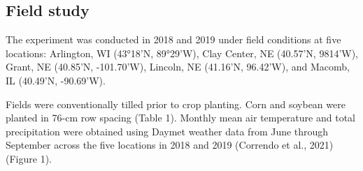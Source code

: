 \documentclass[utf8]{frontiersSCNS}
\begin{document}
\hypertarget{field-study}{%
\subsection*{Field study}\label{field-study}}

The experiment was conducted in 2018 and 2019 under field conditions at
five locations: Arlington, WI (43°18'N, 89°29'W), Clay Center, NE
(40.57'N, 9814'W), Grant, NE (40.85'N, -101.70'W), Lincoln, NE (41.16'N,
96.42'W), and Macomb, IL (40.49'N, -90.69'W).

Fields were conventionally tilled prior to crop planting. Corn and
soybean were planted in 76-cm row spacing (Table 1). Monthly mean air
temperature and total precipitation were obtained using Daymet weather
data from June through September across the five locations in 2018 and
2019 (Correndo et al., 2021) (Figure 1).
\end{document}
